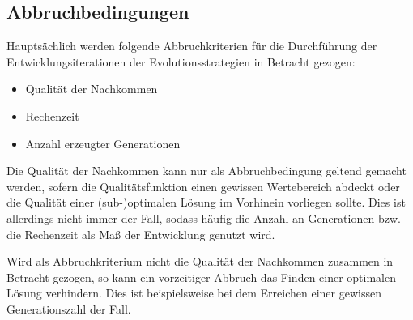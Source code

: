 \subsection{Abbruchbedingungen}

Hauptsächlich werden folgende Abbruchkriterien für die Durchführung der Entwicklungsiterationen der Evolutionsstrategien in Betracht gezogen:

\begin{itemize}
	\item Qualität der Nachkommen
	\item Rechenzeit
	\item Anzahl erzeugter Generationen
\end{itemize}

Die Qualität der Nachkommen kann nur als Abbruchbedingung geltend gemacht werden, sofern die Qualitätsfunktion einen gewissen Wertebereich abdeckt oder die Qualität einer (sub-)optimalen Lösung im Vorhinein vorliegen sollte. Dies ist allerdings nicht immer der Fall, sodass häufig die Anzahl an Generationen bzw. die Rechenzeit als Maß der Entwicklung genutzt wird.

Wird als Abbruchkriterium nicht die Qualität der Nachkommen zusammen in Betracht gezogen, so kann ein vorzeitiger Abbruch das Finden einer optimalen Lösung verhindern.
Dies ist beispielsweise bei dem Erreichen einer gewissen Generationszahl der Fall.

